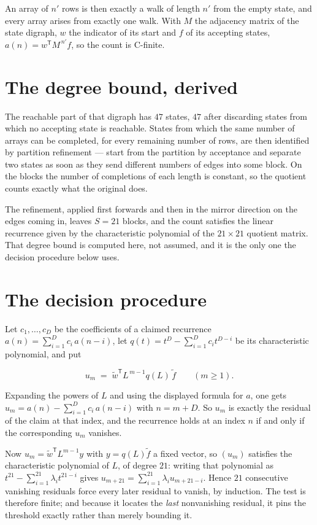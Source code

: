 \documentclass[11pt]{article}
\theoremstyle{definition}
\begin{document}
An array of $n'$ rows is then exactly a walk of length $n'$ from the empty state, and every array arises from exactly one walk. With $M$ the adjacency matrix of the state digraph, $w$ the indicator of its start and $f$ of its accepting states, $a(n) = w^{\mathsf T}M^{\,n'}f$, so the count is C-finite.

\section{The degree bound, derived}

The reachable part of that digraph has $47$ states, $47$ after discarding states from which no accepting state is reachable. States from which the same number of arrays can be completed, for every remaining number of rows, are then identified by partition refinement --- start from the partition by acceptance and separate two states as soon as they send different numbers of edges into some block. On the blocks the number of completions of each length is constant, so the quotient counts exactly what the original does.

The refinement, applied first forwards and then in the mirror direction on the edges coming in, leaves $S = 21$ blocks, and the count satisfies the linear recurrence given by the characteristic polynomial of the $21 \times 21$ quotient matrix. That degree bound is computed here, not assumed, and it is the only one the decision procedure below uses.

\section{The decision procedure}

Let $c_1,\dots,c_D$ be the coefficients of a claimed recurrence $a(n) = \sum_{i=1}^{D} c_i\,a(n-i)$, let $q(t) = t^{D} - \sum_{i=1}^{D} c_i t^{D-i}$ be its characteristic polynomial, and put

\[u_m \;=\; \tilde w^{\mathsf T} L^{\,m-1} q(L)\,\tilde f \qquad (m \ge 1).\]

Expanding the powers of $L$ and using the displayed formula for $a$, one gets $u_m = a(n) - \sum_{i=1}^{D} c_i\,a(n-i)$ with $n = m + D$. So $u_m$ is exactly the residual of the claim at that index, and the recurrence holds at an index $n$ if and only if the corresponding $u_m$ vanishes.

Now $u_m = \tilde w^{\mathsf T} L^{m-1} y$ with $y = q(L)\tilde f$ a fixed vector, so $(u_m)$ satisfies the characteristic polynomial of $L$, of degree $21$: writing that polynomial as $t^{21} - \sum_{i=1}^{21} \lambda_i t^{21-i}$ gives $u_{m+21} = \sum_{i=1}^{21} \lambda_i u_{m+21-i}$. Hence $21$ consecutive vanishing residuals force every later residual to vanish, by induction. The test is therefore finite; and because it locates the {\itshape last} nonvanishing residual, it pins the threshold exactly rather than merely bounding it.
\end{document}
